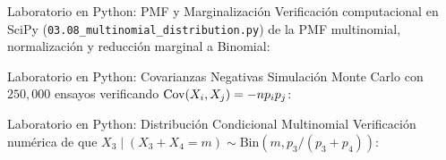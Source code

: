\documentclass[10pt, aspectratio=169]{beamer}
\begin{document}
\begin{frame}[fragile]{Laboratorio en Python: PMF y Marginalización}
  \scriptsize
  Verificación computacional en SciPy (\texttt{03.08\_multinomial\_distribution.py}) de la PMF multinomial, normalización y reducción marginal a Binomial:
  \vspace{0.05cm}
  {
  }
\end{frame}

\begin{frame}[fragile]{Laboratorio en Python: Covarianzas Negativas}
  \scriptsize
  Simulación Monte Carlo con $250{,}000$ ensayos verificando $\operatorname{Cov}(X_{i}, X_{j}) = -n p_{i} p_{j}$:
  \vspace{0.02cm}
  {
  }
\end{frame}

\begin{frame}[fragile]{Laboratorio en Python: Distribución Condicional Multinomial}
  \scriptsize
  Verificación numérica de que $X_{3} \mid (X_{3} + X_{4} = m) \sim \text{Bin}(m, p_{3}/(p_{3} + p_{4}))$:
  \vspace{0.02cm}
  {
  }
\end{frame}
\end{document}
